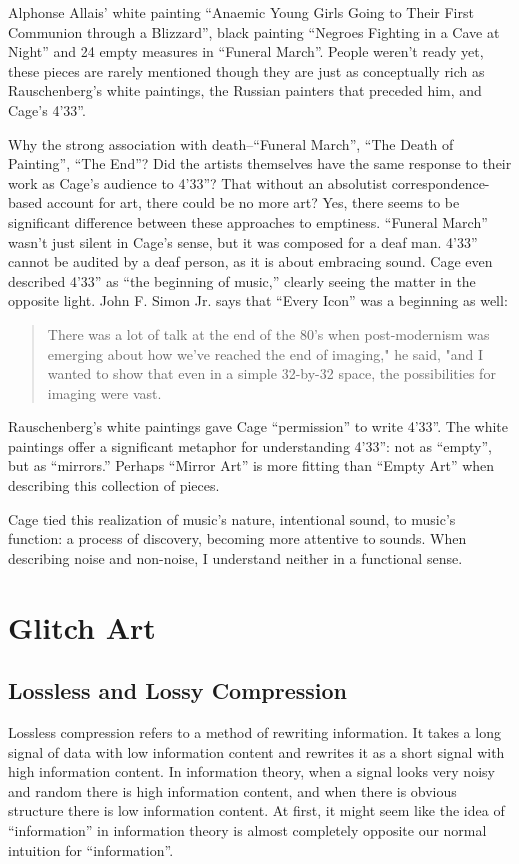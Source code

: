 \documentclass{thesis}
\begin{document}
	Alphonse Allais' white painting ``Anaemic Young Girls Going to Their First Communion through a Blizzard'', black painting ``Negroes Fighting in a Cave at Night'' and 24 empty measures in ``Funeral March''. People weren't ready yet, these pieces are rarely mentioned though they are just as conceptually rich as Rauschenberg's white paintings, the Russian painters that preceded him, and Cage's 4'33''.
	
	Why the strong association with death--``Funeral March'', ``The Death of Painting'', ``The End''? Did the artists themselves have the same response to their work as Cage's audience to 4'33''? That without an absolutist correspondence-based account for art, there could be no more art? Yes, there seems to be significant difference between these approaches to emptiness. ``Funeral March'' wasn't just silent in Cage's sense, but it was composed for a deaf man. 4'33'' cannot be audited by a deaf person, as it is about embracing sound. Cage even described 4'33'' as ``the beginning of music,'' clearly seeing the matter in the opposite light. John F. Simon Jr. says that ``Every Icon'' was a beginning as well:
	
		\begin{quote}
	There was a lot of talk at the end of the 80's when post-modernism was emerging about how we've reached the end of imaging," he said, "and I wanted to show that even in a simple 32-by-32 space, the possibilities for imaging were vast.\cite{matthew_mirapaul_in_1997}
	\end{quote}
	
	Rauschenberg's white paintings gave Cage ``permission'' to write 4'33''. The white paintings offer a significant metaphor for understanding 4'33'': not as ``empty'', but as ``mirrors.'' Perhaps ``Mirror Art'' is more fitting than ``Empty Art'' when describing this collection of pieces.
	
	Cage tied this realization of music's nature, intentional sound, to music's function: a process of discovery, becoming more attentive to sounds. When describing noise and non-noise, I understand neither in a functional sense.

\chapter{Glitch Art}

\section{Lossless and Lossy Compression}
	Lossless compression refers to a method of rewriting information. It takes a long signal of data with low information content and rewrites it as a short signal with high information content. In information theory, when a signal looks very noisy and random there is high information content, and when there is obvious structure there is low information content. At first, it might seem like the idea of ``information'' in information theory is almost completely opposite our normal intuition for ``information''.
	
\end{document}

